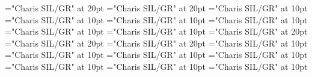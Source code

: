 \documentclass[a4paper]{article}
\begin{document}
\pagestyle{plain}
\sloppy
\setlength{\parfillskip}{0pt plus 1fil}
\font\pronunciationenUKpronunciationbefore="Charis SIL/GR" at 20pt
\font\pronunciationenUSpronunciationbefore="Charis SIL/GR" at 20pt
\font\sectionletterdictionary="Charis SIL/GR" at 10pt
\font\headsectionletterdictionary="Charis SIL/GR" at 10pt
\font\articledictionary="Charis SIL/GR" at 10pt
\font\firstoftypeheadwordlastoftypearticledictionary="Charis SIL/GR" at 10pt
\font\firstoftypegrammarrequireslastoftypearticledictionary="Charis SIL/GR" at 10pt
\font\firstoftypelastoftyperelationsynonymarticledictionary="Charis SIL/GR" at 10pt
\font\firstoftypepronunciationenUKarticledictionary="Charis SIL/GR" at 20pt
\font\lastoftypepronunciationenUSarticledictionary="Charis SIL/GR" at 20pt
\font\lastoftypepronunciationenUKarticledictionary="Charis SIL/GR" at 20pt
\font\firstoftypegrammarcategorylastoftypearticledictionary="Charis SIL/GR" at 10pt
\font{}="Charis SIL/GR" at 10pt
\font\firstoftypelastoftypenotearticledictionary="Charis SIL/GR" at 10pt
\font\exampleusefirstoftypearticledictionary="Charis SIL/GR" at 10pt
\font\examplefirstoftypearticledictionary="Charis SIL/GR" at 10pt
\font\exampleuselastoftypearticledictionary="Charis SIL/GR" at 10pt
\font\examplelastoftypearticledictionary="Charis SIL/GR" at 10pt

\mbox{} 
\newpage 
\newpage 
\setcounter{page}{1} 
\pagestyle{fancy} 


\end{document}

